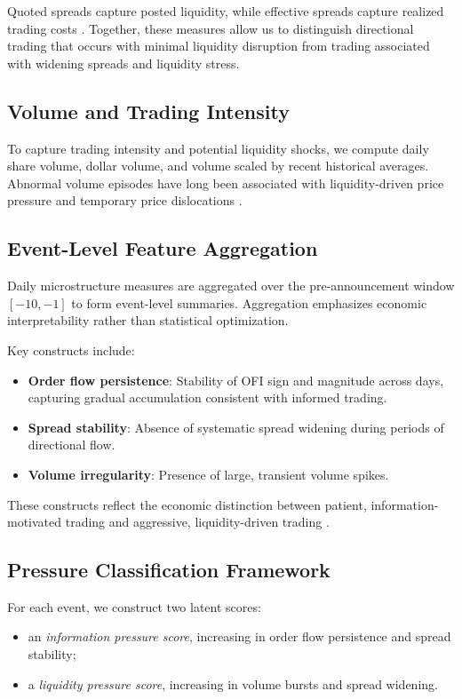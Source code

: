 Quoted spreads capture posted liquidity, while effective spreads capture realized
trading costs \citep{GlostenHarris1988}. Together, these measures allow us to
distinguish directional trading that occurs with minimal liquidity disruption
from trading associated with widening spreads and liquidity stress.

\subsection{Volume and Trading Intensity}

To capture trading intensity and potential liquidity shocks, we compute daily
share volume, dollar volume, and volume scaled by recent historical averages.
Abnormal volume episodes have long been associated with liquidity-driven price
pressure and temporary price dislocations
\citep{CampbellGrossmanWang1993}.

\subsection{Event-Level Feature Aggregation}

Daily microstructure measures are aggregated over the pre-announcement window
$[-10,-1]$ to form event-level summaries. Aggregation emphasizes economic
interpretability rather than statistical optimization.

Key constructs include:
\begin{itemize}
    \item \textbf{Order flow persistence}: Stability of OFI sign and magnitude
    across days, capturing gradual accumulation consistent with informed trading.
    \item \textbf{Spread stability}: Absence of systematic spread widening during
    periods of directional flow.
    \item \textbf{Volume irregularity}: Presence of large, transient volume spikes.
\end{itemize}

These constructs reflect the economic distinction between patient,
information-motivated trading and aggressive, liquidity-driven trading
\citep{Kyle1985,AdmatiPfleiderer1988}.

\subsection{Pressure Classification Framework}

For each event, we construct two latent scores:
\begin{itemize}
    \item an \emph{information pressure score}, increasing in order flow
    persistence and spread stability;
    \item a \emph{liquidity pressure score}, increasing in volume bursts and
    spread widening.
\end{itemize}

